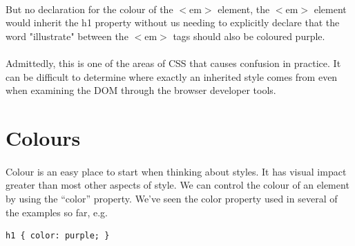 \paragraph{} But no declaration for the colour of the $<$em$>$ element, the $<$em$>$ element would inherit the h1 property without us needing to explicitly declare that the word "illustrate" between the $<$em$>$ tags should also be coloured purple.

\paragraph{} Admittedly, this is one of the areas of CSS that causes confusion in practice. It can be difficult to determine where exactly an inherited style comes from even when examining the DOM through the browser developer tools.



\section{Colours}
\paragraph{} Colour is an easy place to start when thinking about styles. It has visual impact greater than most other aspects of style. We can control the colour of an element by using the ``color'' property. We've seen the color property used in several of the examples so far, e.g.

\begin{lstlisting}
h1 { color: purple; }
\end{lstlisting}


